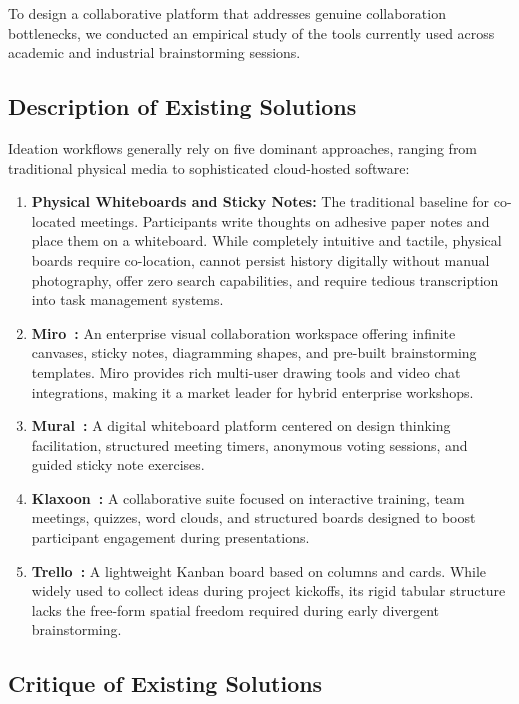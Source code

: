 To design a collaborative platform that addresses genuine collaboration bottlenecks, we conducted an empirical study of the tools currently used across academic and industrial brainstorming sessions.

\subsection{Description of Existing Solutions}
\label{subsec:existing_solutions}

Ideation workflows generally rely on five dominant approaches, ranging from traditional physical media to sophisticated cloud-hosted software:

\begin{enumerate}[leftmargin=1.5em]
    \item \textbf{Physical Whiteboards and Sticky Notes:} The traditional baseline for co-located meetings. Participants write thoughts on adhesive paper notes and place them on a whiteboard. While completely intuitive and tactile, physical boards require co-location, cannot persist history digitally without manual photography, offer zero search capabilities, and require tedious transcription into task management systems.
    \item \textbf{Miro~\cite{miro2026}:} An enterprise visual collaboration workspace offering infinite canvases, sticky notes, diagramming shapes, and pre-built brainstorming templates. Miro provides rich multi-user drawing tools and video chat integrations, making it a market leader for hybrid enterprise workshops.
    \item \textbf{Mural~\cite{mural2026}:} A digital whiteboard platform centered on design thinking facilitation, structured meeting timers, anonymous voting sessions, and guided sticky note exercises.
    \item \textbf{Klaxoon~\cite{klaxoon2026}:} A collaborative suite focused on interactive training, team meetings, quizzes, word clouds, and structured boards designed to boost participant engagement during presentations.
    \item \textbf{Trello~\cite{trello2026}:} A lightweight Kanban board based on columns and cards. While widely used to collect ideas during project kickoffs, its rigid tabular structure lacks the free-form spatial freedom required during early divergent brainstorming.
\end{enumerate}

\subsection{Critique of Existing Solutions}
\label{subsec:critique_solutions}

